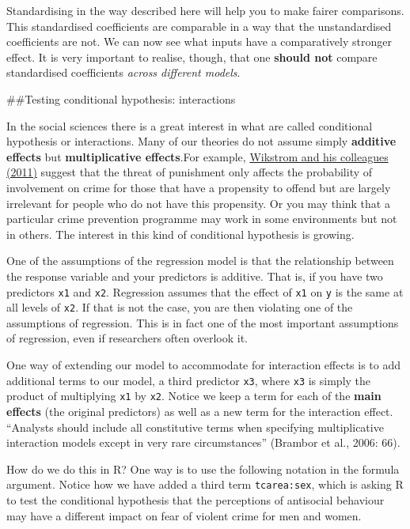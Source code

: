 \documentclass[]{book}
\theoremstyle{definition}
\theoremstyle{definition}
\theoremstyle{definition}
\theoremstyle{remark}
\begin{document}
Standardising in the way described here will help you to make fairer
comparisons. This standardised coefficients are comparable in a way that
the unstandardised coefficients are not. We can now see what inputs have
a comparatively stronger effect. It is very important to realise,
though, that one \textbf{should not} compare standardised coefficients
\emph{across different models}.

\#\#Testing conditional hypothesis: interactions

In the social sciences there is a great interest in what are called
conditional hypothesis or interactions. Many of our theories do not
assume simply \textbf{additive effects} but \textbf{multiplicative
effects}.For example,
\href{http://euc.sagepub.com/content/8/5/401.short}{Wikstrom and his
colleagues (2011)} suggest that the threat of punishment only affects
the probability of involvement on crime for those that have a propensity
to offend but are largely irrelevant for people who do not have this
propensity. Or you may think that a particular crime prevention
programme may work in some environments but not in others. The interest
in this kind of conditional hypothesis is growing.

One of the assumptions of the regression model is that the relationship
between the response variable and your predictors is additive. That is,
if you have two predictors \texttt{x1} and \texttt{x2}. Regression
assumes that the effect of \texttt{x1} on \texttt{y} is the same at all
levels of \texttt{x2}. If that is not the case, you are then violating
one of the assumptions of regression. This is in fact one of the most
important assumptions of regression, even if researchers often overlook
it.

One way of extending our model to accommodate for interaction effects is
to add additional terms to our model, a third predictor \texttt{x3},
where \texttt{x3} is simply the product of multiplying \texttt{x1} by
\texttt{x2}. Notice we keep a term for each of the \textbf{main effects}
(the original predictors) as well as a new term for the interaction
effect. ``Analysts should include all constitutive terms when specifying
multiplicative interaction models except in very rare circumstances''
(Brambor et al., 2006: 66).

How do we do this in R? One way is to use the following notation in the
formula argument. Notice how we have added a third term
\texttt{tcarea:sex}, which is asking R to test the conditional
hypothesis that the perceptions of antisocial behaviour may have a
different impact on fear of violent crime for men and women.
\end{document}

